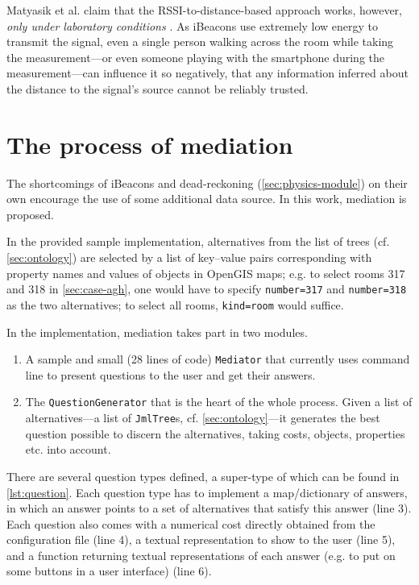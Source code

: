 Matyasik et al. claim that the RSSI-to-distance-based approach works, however, \emph{only under laboratory conditions} \cite{Matyasik:iBeacon, Matyasik:iBeacon:slides}. As iBeacons use extremely low energy to transmit the signal, even a single person walking across the room while taking the measurement---or even someone playing with the smartphone during the measurement---can influence it so negatively, that any information inferred about the distance to the signal's source cannot be reliably trusted.

\section{The process of mediation}
\label{sec:mediation}

The shortcomings of iBeacons and dead-reckoning (\cref{sec:physics-module}) on their own encourage the use of some additional data source. In this work, mediation is proposed.

In the provided sample implementation, alternatives from the list of trees (cf. \cref{sec:ontology}) are selected by a list of key--value pairs corresponding with property names and values of objects in OpenGIS maps; e.g. to select rooms 317 and 318 in \cref{sec:case-agh}, one would have to specify \texttt{number=317} and \texttt{number=318} as the two alternatives; to select all rooms, \texttt{kind=room} would suffice.

In the implementation, mediation takes part in two modules.

\begin{enumerate}
	\item A sample and small (28 lines of code) \texttt{Mediator} that currently uses command line to present questions to the user and get their answers. 
	\item The \texttt{QuestionGenerator} that is the heart of the whole process. Given a list of alternatives---a list of \texttt{JmlTree}s, cf. \cref{sec:ontology}---it generates the best question possible to discern the alternatives, taking costs, objects, properties etc. into account.
\end{enumerate}

There are several question types defined, a super-type of which can be found in \cref{lst:question}. Each question type has to implement a map/dictionary of answers, in which an answer points to a set of alternatives that satisfy this answer (line 3). Each question also comes with a numerical cost directly obtained from the configuration file (line 4), a textual representation to show to the user (line 5), and a function returning textual representations of each answer (e.g. to put on some buttons in a user interface) (line 6).

